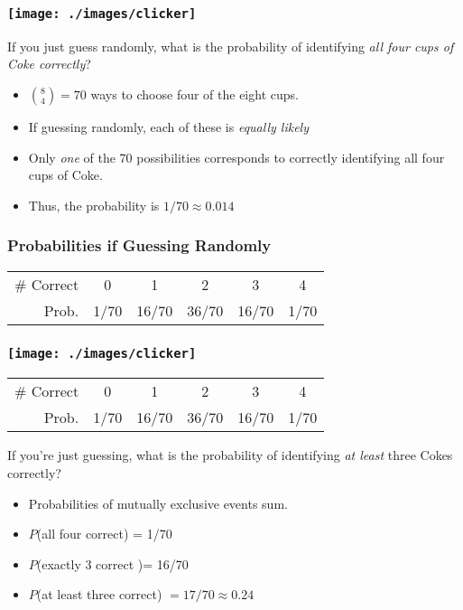 \begin{frame}
\frametitle{\texttt{[image: ./images/clicker]}}
If you just guess randomly, what is the probability of identifying \emph{all four cups of Coke correctly}?
\pause
\begin{itemize}
\item ${8\choose 4}=70$ ways to choose four of the eight cups. \pause
\item If guessing randomly, each of these is \emph{\alert{equally likely}} \pause
\item Only \emph{\alert{one}} of the 70 possibilities corresponds to correctly identifying all four cups of Coke. \pause
\item Thus, the probability is $1/70 \approx 0.014$
\end{itemize}
\end{frame}
\begin{frame}
\frametitle{Probabilities if Guessing Randomly}
	\begin{center}
		\begin{tabular}{rccccc}
		\hline
		\# Correct & 0 & 1 & 2 & 3 & 4\\
		Prob.&1/70 & 16/70 & 36/70 & 16/70 &1/70\\
		\hline
		\end{tabular}
	\end{center}
\end{frame}
\begin{frame}
	\frametitle{\texttt{[image: ./images/clicker]}}
	\begin{center}
		\begin{tabular}{rccccc}
		\hline
		\# Correct & 0 & 1 & 2 & 3 & 4\\
		Prob.&1/70 & 16/70 & 36/70 & 16/70 &1/70\\
		\hline
		\end{tabular}
	\end{center}
	If you're just guessing, what is the probability of identifying \alert{\emph{at least}} three Cokes correctly?
	\pause
	\begin{itemize}
\item Probabilities of mutually exclusive events sum. 
\item $P$(all four correct) = 1/70 
\item $P$(exactly 3 correct )= 16/70 
\item $P$(at least three correct) $ = 17/70 \approx 0.24$

\end{itemize}
\end{frame}


